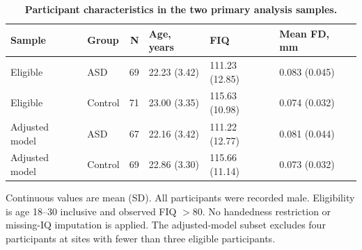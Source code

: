 \begin{table}[H]
\centering\small
\caption{\textbf{Participant characteristics in the two primary analysis samples.}}\label{tab:demographics}
\begin{tabular}{llrlll}
\toprule
Sample & Group & N & Age, years & FIQ & Mean FD, mm \\
\midrule
Eligible & ASD & 69 & 22.23 (3.42) & 111.23 (12.85) & 0.083 (0.045) \\
Eligible & Control & 71 & 23.00 (3.35) & 115.63 (10.98) & 0.074 (0.032) \\
Adjusted model & ASD & 67 & 22.16 (3.42) & 111.22 (12.77) & 0.081 (0.044) \\
Adjusted model & Control & 69 & 22.86 (3.30) & 115.66 (11.14) & 0.073 (0.032) \\
\bottomrule
\end{tabular}
\begin{flushleft}\footnotesize
Continuous values are mean (SD). All participants were recorded male. Eligibility is age 18--30 inclusive and observed FIQ $>80$. No handedness restriction or missing-IQ imputation is applied. The adjusted-model subset excludes four participants at sites with fewer than three eligible participants.
\end{flushleft}
\end{table}
